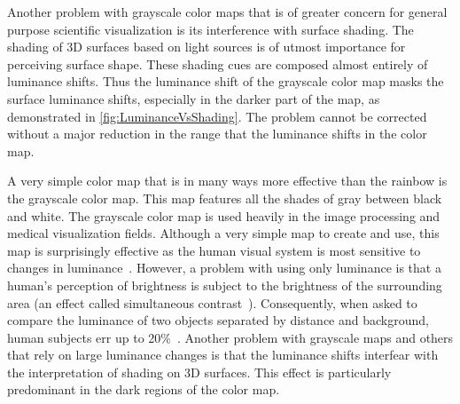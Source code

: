 \documentclass{llncs}
\newcommand{\lcite}[1]{~\cite{#1}}
\begin{document}
{  Another problem with grayscale color maps that is of greater concern for
  general purpose scientific visualization is its interference with surface
  shading.  The shading of 3D surfaces based on light sources is of utmost
  importance for perceiving surface shape.  These shading cues are composed
  almost entirely of luminance shifts.  Thus the luminance shift of the
  grayscale color map masks the surface luminance shifts, especially in the
  darker part of the map, as demonstrated in
  \autoref{fig:LuminanceVsShading}.  The problem cannot be corrected
  without a major reduction in the range that the luminance shifts in the
  color map.

}{

  A very simple color map that is in many ways more effective than the
  rainbow is the grayscale color map.  This map features all the shades of
  gray between black and white.  The grayscale color map is used heavily in
  the image processing and medical visualization fields.  Although a very
  simple map to create and use, this map is surprisingly effective as the
  human visual system is most sensitive to changes in
  luminance\lcite{Mullen85,Ware04}.  However, a problem with using only
  luminance is that a human's perception of brightness is subject to the
  brightness of the surrounding area (an effect called simultaneous
  contrast\lcite{Stone05}).  Consequently, when asked to compare the
  luminance of two objects separated by distance and background, human
  subjects err up to 20\%\lcite{Ware88}.  Another problem with grayscale
  maps and others that rely on large luminance changes is that the
  luminance shifts interfear with the interpretation of shading on 3D
  surfaces.  This effect is particularly predominant in the dark regions of
  the color map.

}
\end{document}

